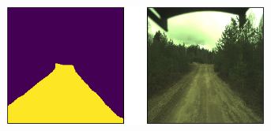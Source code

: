 \documentclass[USenglish]{ifimaster}  %
\begin{document}
\begin{appendices}
\begin{figure}[ht]
\begin{subfigure}[b]{\textwidth}
\end{subfigure}
\hfill
\begin{subfigure}[b]{\textwidth}
\centering
\includegraphics[width=0.95\textwidth]{bilder/appendix_1/2017-05-09-13-26-47-00075.png}
\end{subfigure}
\end{figure}


\end{appendices}
\end{document}
